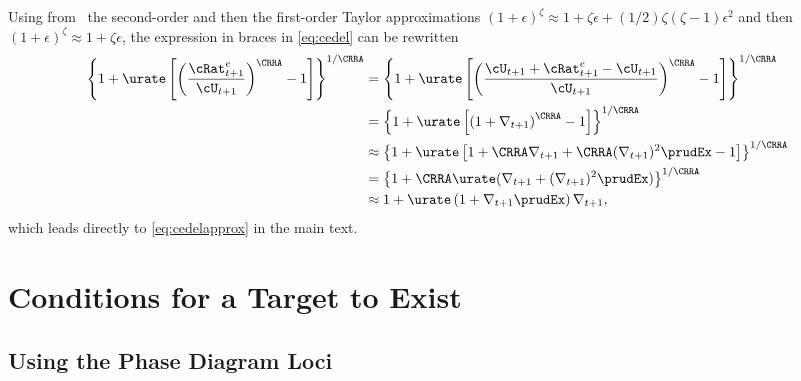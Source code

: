 \documentclass{handout}
\begin{document}
Using from \MathFactsList ~the second-order and then the first-order
Taylor approximations  \TaylorTwo $(1+\epsilon)^{\zeta} \approx 1 + \zeta \epsilon +
(1/2)\zeta(\zeta-1) \epsilon^{2}$ and then \TaylorOne $(1+\epsilon)^{\zeta} \approx 1 + \zeta \epsilon$, the expression in braces
in \eqref{eq:cedel} can be rewritten
\begin{equation}\begin{gathered}\begin{aligned}
        \left\{1+\urate\left[\left(\frac{{\cRat}^{e}_{t+1}}{\cU_{t+1}}\right)^{\CRRA}-1\right]\right\}^{1/\CRRA} & =  \left\{1+\urate\left[\left(\frac{\cU_{t+1}+{\cRat}^{e}_{t+1}-\cU_{t+1}}{\cU_{t+1}}\right)^{\CRRA}-1\right]\right\}^{1/\CRRA} \notag
\\      & =  \left\{1+\urate\left[\left(1+\nabla _{t+1}\right)^{\CRRA}-1\right]\right\}^{1/\CRRA} \notag
\\      & \approx       \left\{1+\urate\left[1+\CRRA \nabla _{t+1}+ \CRRA (\nabla _{t+1})^{2}\prudEx-1\right]\right\}^{1/\CRRA} \notag 
\\ & =          \left\{1+ \CRRA \urate (\nabla _{t+1}+ (\nabla _{t+1})^{2}\prudEx)\right\}^{1/\CRRA} \notag
\\ & \approx  1+ \urate  \left(1+\nabla _{t+1}\prudEx\right)\nabla _{t+1}, \notag
\end{aligned}\end{gathered}\end{equation}
which leads directly to \eqref{eq:cedelapprox} in the main text.


\section{Conditions for a Target to Exist}\label{sec:mTargExists}

\subsection{Using the Phase Diagram Loci} 
 
\end{document}
